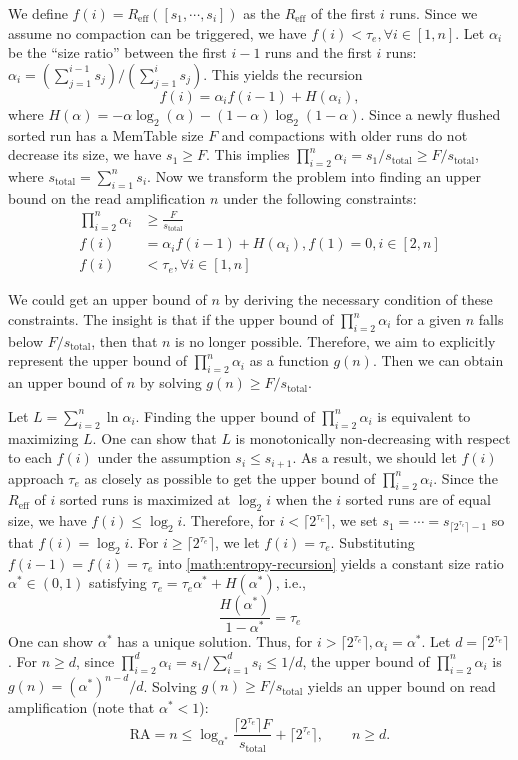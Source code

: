 \documentclass[sigconf]{acmart}
\begin{document}
We define $f(i) = R_\text{eff}([s_1, \cdots, s_i])$ as the $R_\text{eff}$ of the first $i$ runs. Since we assume no compaction can be triggered, we have $f(i) < \tau_e, \forall i\in[1, n]$. Let $\alpha_{i}$ be the ``size ratio'' between the first $i-1$ runs and the first $i$ runs: $\alpha_{i}=(\sum_{j=1}^{i-1} s_j)/(\sum_{j=1}^i s_j)$. This yields the recursion
\begin{equation}\label{math:entropy-recursion}
f(i)=\alpha_i f(i-1) + H(\alpha_i),
\end{equation}
where $H(\alpha)=-\alpha \log_2(\alpha)-(1-\alpha)\log_2(1-\alpha)$. Since a newly flushed sorted run has a MemTable size $F$ and compactions with older runs do not decrease its size, we have $s_1 \ge F$. This implies $\prod_{i=2}^n \alpha_i = s_1 / s_\text{total} \ge F / s_\text{total}$, where $s_\text{total} = \sum_{i=1}^n s_i$. Now we transform the problem into finding an upper bound on the read amplification $n$ under the following constraints:
\begin{align*}
\prod_{i=2}^n \alpha_i & \ge \frac{F}{s_\text{total}} \\
f(i) & = \alpha_{i} f(i-1) + H(\alpha_{i}), f(1)=0, i\in [2, n] \\
f(i) & < \tau_e, \forall i \in [1, n]
\end{align*}

We could get an upper bound of $n$ by deriving the necessary condition of these constraints. The insight is that if the upper bound of $\prod_{i=2}^n \alpha_i$ for a given $n$ falls below $F / s_\text{total}$, then that $n$ is no longer possible. Therefore, we aim to explicitly represent the upper bound of $\prod_{i=2}^n \alpha_i$ as a function $g(n)$. Then we can obtain an upper bound of $n$ by solving $g(n)\ge F / s_\text{total}$.

Let $L = \sum_{i=2}^n \ln \alpha_i$. Finding the upper bound of $\prod_{i=2}^n \alpha_i$ is equivalent to maximizing $L$. One can show that $L$ is monotonically non-decreasing with respect to each $f(i)$ under the assumption $s_i \le s_{i+1}$. As a result, we should let $f(i)$ approach $\tau_e$ as closely as possible to get the upper bound of $\prod_{i=2}^n \alpha_i$. Since the $R_\text{eff}$ of $i$ sorted runs is maximized at $\log_2 i$ when the $i$ sorted runs are of equal size, we have $f(i) \le \log_2 i$. Therefore, for $i < \lceil 2^{\tau_e} \rceil$, we set $s_1 = \cdots = s_{\lceil 2^{\tau_e}\rceil - 1}$ so that $f(i) = \log_2 i$. For $i \ge \lceil 2^{\tau_e} \rceil$, we let $f(i) = \tau_e$. Substituting $f(i-1) = f(i) = \tau_e$ into \cref{math:entropy-recursion} yields a constant size ratio $\alpha^* \in (0, 1)$ satisfying $\tau_e = \tau_e\alpha^*+H(\alpha^*)$, i.e.,
$$
\frac{H(\alpha^*)}{1-\alpha^*} = \tau_e
$$
One can show $\alpha^*$ has a unique solution.
Thus, for $i > \lceil 2^{\tau_e} \rceil, \alpha_i = \alpha^*$. Let $d = \lceil 2^{\tau_e} \rceil$. For $n \ge d$, since $\prod_{i=2}^{d} \alpha_i = s_1 / \sum_{i=1}^d s_i \le 1/d$, the upper bound of $\prod_{i=2}^n \alpha_i$ is $g(n)=(\alpha^*)^{n-d} / d$. Solving $g(n) \ge F / s_\text{total}$ yields an upper bound on read amplification (note that $\alpha^* < 1$):
$$
\text{RA} = n \le \log_{\alpha^*}\frac{\lceil 2^{\tau_e} \rceil F}{s_\text{total}} + \lceil 2^{\tau_e} \rceil, \qquad n\ge d.
$$
\end{document}
